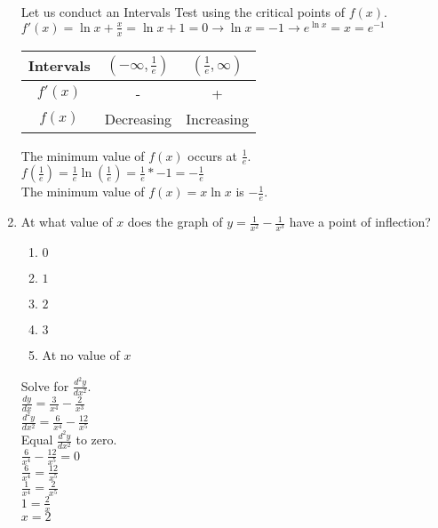 \documentclass[10pt, letterpaper]{report}
\begin{document}
\begin{enumerate}
    Let us conduct an Intervals Test using the critical points of $f(x)$. \\
    
    $f'(x)=\ln{x}+\frac{x}{x}=\ln{x}+1=0\rightarrow \ln{x}=-1\rightarrow e^{\ln{x}}=x=e^{-1}$ \\
    
    \begin{center}
      \begin{tabular}{| c | c | c |}
        \hline
        Intervals & $(-\infty, \frac{1}{e})$ & $(\frac{1}{e}, \infty)$ \\
        \hline
        $f'(x)$ & - & + \\
        \hline
        $f(x)$ & Decreasing & Increasing \\
        \hline
      \end{tabular}
    \end{center}
    
    The minimum value of $f(x)$ occurs at $\frac{1}{e}$. \\
    
    $f(\frac{1}{e})=\frac{1}{e}\ln{(\frac{1}{e})}=\frac{1}{e}*-1=-\frac{1}{e}$ \\
    
    The minimum value of $f(x)=x\ln{x}$ is $-\frac{1}{e}$. \\
    
    \pagebreak
  \item{At what value of $x$ does the graph of $y=\frac{1}{x^{2}}-\frac{1}{x^{3}}$ have a point of inflection?}
    \begin{enumerate}
      \item{$0$}
      \item{$1$}
      \item{$2$}
      \item{$3$}
      \item{At no value of $x$} \\
    \end{enumerate}
  
    Solve for $\frac{d^{2}y}{dx^{2}}$. \\
    
    $\frac{dy}{dx}=\frac{3}{x^{4}}-\frac{2}{x^{3}}$ \\
    
    $\frac{d^{2}y}{dx^{2}}=\frac{6}{x^{4}}-\frac{12}{x^{5}}$ \\
    
    Equal $\frac{d^{2}y}{dx^{2}}$ to zero. \\
    
    $\frac{6}{x^{4}}-\frac{12}{x^{5}}=0$ \\
    
    $\frac{6}{x^{4}}=\frac{12}{x^{5}}$ \\
    
    $\frac{1}{x^{4}}=\frac{2}{x^{5}}$ \\
    
    $1 = \frac{2}{x}$ \\
    
    $x=2$ \\
\end{enumerate}
\end{document}
